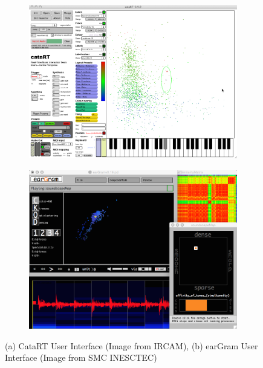 \begin{figure}
\centering
\begin{subfigure}[b]{0.9\textwidth}
   \includegraphics[width=1\linewidth]{ch04_sota/figures/catart.png}
   \caption{}
   \label{fig:catart} 
\end{subfigure}

\begin{subfigure}[b]{0.9\textwidth}
   \includegraphics[width=1\linewidth]{ch04_sota/figures/eargram.png}
   \caption{}
   \label{fig:eargram}
\end{subfigure}

\caption[CataRT and Eargram]{(a) CataRT User Interface (Image from IRCAM), (b) earGram User Interface (Image from  SMC INESCTEC)}
\end{figure}

